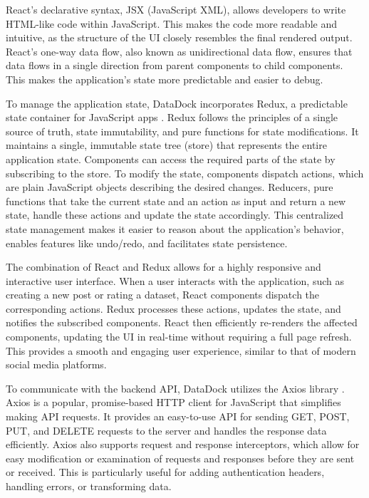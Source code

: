 \documentclass[conference]{IEEEtran}
\begin{document}
React's declarative syntax, JSX (JavaScript XML), allows developers to write HTML-like code within JavaScript. This makes the code more readable and intuitive, as the structure of the UI closely resembles the final rendered output. React's one-way data flow, also known as unidirectional data flow, ensures that data flows in a single direction from parent components to child components. This makes the application's state more predictable and easier to debug.

To manage the application state, DataDock incorporates Redux, a predictable state container for JavaScript apps \cite{redux}. Redux follows the principles of a single source of truth, state immutability, and pure functions for state modifications. It maintains a single, immutable state tree (store) that represents the entire application state. Components can access the required parts of the state by subscribing to the store. To modify the state, components dispatch actions, which are plain JavaScript objects describing the desired changes. Reducers, pure functions that take the current state and an action as input and return a new state, handle these actions and update the state accordingly. This centralized state management makes it easier to reason about the application's behavior, enables features like undo/redo, and facilitates state persistence.

The combination of React and Redux allows for a highly responsive and interactive user interface. When a user interacts with the application, such as creating a new post or rating a dataset, React components dispatch the corresponding actions. Redux processes these actions, updates the state, and notifies the subscribed components. React then efficiently re-renders the affected components, updating the UI in real-time without requiring a full page refresh. This provides a smooth and engaging user experience, similar to that of modern social media platforms.

To communicate with the backend API, DataDock utilizes the Axios library \cite{axios}. Axios is a popular, promise-based HTTP client for JavaScript that simplifies making API requests. It provides an easy-to-use API for sending GET, POST, PUT, and DELETE requests to the server and handles the response data efficiently. Axios also supports request and response interceptors, which allow for easy modification or examination of requests and responses before they are sent or received. This is particularly useful for adding authentication headers, handling errors, or transforming data.
\end{document}
